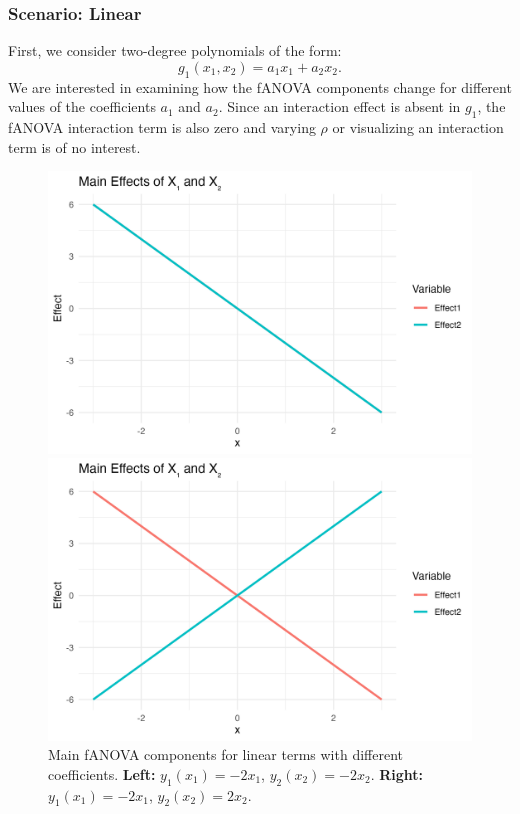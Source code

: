 \subsubsection*{Scenario: Linear}
First, we consider two-degree polynomials of the form:
$$g_1(x_1, x_2) = a_1 x_1 + a_2 x_2.$$
We are interested in examining how the fANOVA components change for different values of the coefficients $a_1$ and $a_2$. 
Since an interaction effect is absent in $g_1$, the fANOVA interaction term is also zero and varying $\rho$ or visualizing an interaction term is of no interest.
\begin{figure}[htpb]
    \centering
    \begin{minipage}[t]{0.49\textwidth}
        \centering
        \includegraphics[width=\textwidth]{images/linear_a1m20_a2m20_a11p00_a22p00_a12p00_rhop00_main.png}
    \end{minipage}%
    \hfill
    \begin{minipage}[t]{0.49\textwidth}
        \centering
        \includegraphics[width=\textwidth]{images/linear_a1m20_a2p20_a11p00_a22p00_a12p00_rhop00_main.png}
    \end{minipage}
    \caption{Main fANOVA components for linear terms with different coefficients.\textbf{ Left:} $y_1(x_1) = -2x_1$, $y_2(x_2) = -2x_2$.\textbf{ Right:} $y_1(x_1) = -2x_1$, $y_2(x_2) = 2x_2$.}
    \label{fig:linear_main_effects}
\end{figure}



